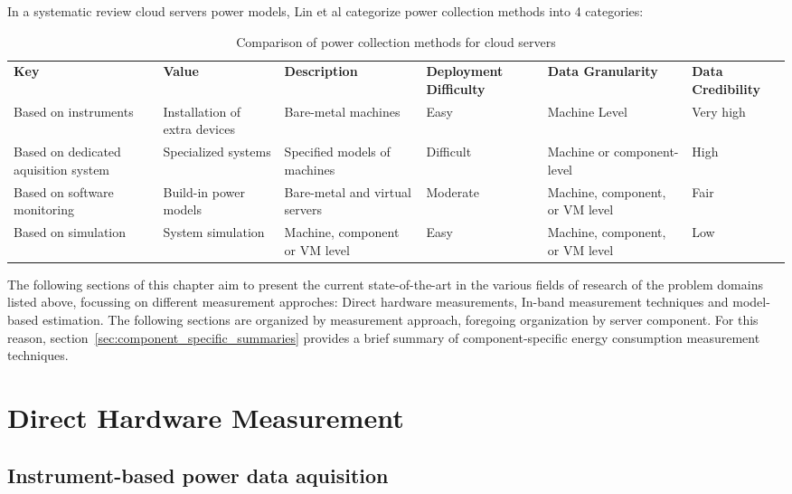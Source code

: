 In a systematic review cloud servers power models, Lin et al\parencite{lin2020taxonomy} categorize power collection methods into 4 categories:
\begin{table}[h]
    \small
    \centering
    \begin{tabular}{ |L{2.0cm}|L{2.0cm}|L{2.5cm}|L{1.9cm}|L{2.2cm}|L{1.6cm}| } 
        \hline
        \textbf{Key} & \textbf{Value} & \textbf{Description} & \textbf{Deployment Difficulty} & \textbf{Data Granularity} & \textbf{Data Credibility}\\
        \Xhline{1.5pt}
        Based on instruments & Installation of extra devices & Bare-metal machines & Easy & Machine Level & Very high \\
        \hline
        Based on dedicated aquisition system & Specialized systems & Specified models of machines & Difficult & Machine or component-level & High \\
        \hline
        Based on software monitoring & Build-in power models & Bare-metal and virtual servers & Moderate & Machine, component, or VM level & Fair \\
        \hline
        Based on simulation & System simulation & Machine, component or VM level & Easy & Machine, component, or VM level & Low \\
        \hline
    \end{tabular}
    \caption[Comparison of power collection methods for cloud servers]{Comparison of power collection methods for cloud servers}
    \label{tab:power_collection_methods}
\end{table}


The following sections of this chapter aim to present the current state-of-the-art in the various fields of research of the problem domains listed above, focussing on different measurement approches: Direct hardware measurements, In-band measurement techniques and model-based estimation. The following sections are organized by measurement approach, foregoing organization by server component. For this reason, section~\ref{sec:component_specific_summaries} provides a brief summary of component-specific energy consumption measurement techniques.

\section{Direct Hardware Measurement}

\subsection{Instrument-based power data aquisition}

